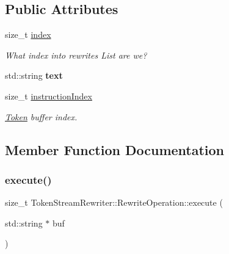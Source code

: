 \subsection*{Public Attributes}
\begin{DoxyCompactItemize}
\item 
\mbox{\label{classantlr4_1_1TokenStreamRewriter_1_1RewriteOperation_a1d3d3c3b22f030f300b3fd7c41a5ec47}} 
size\+\_\+t \hyperlink{classantlr4_1_1TokenStreamRewriter_1_1RewriteOperation_a1d3d3c3b22f030f300b3fd7c41a5ec47}{index}
\begin{DoxyCompactList}\small\item\em What index into rewrites List are we? \end{DoxyCompactList}\item 
\mbox{\label{classantlr4_1_1TokenStreamRewriter_1_1RewriteOperation_a59c0cce85a795ba97acfa8999f3cdfe6}} 
std\+::string {\bfseries text}
\item 
\mbox{\label{classantlr4_1_1TokenStreamRewriter_1_1RewriteOperation_a6a6ef7ecb15f2be19e86808187469f70}} 
size\+\_\+t \hyperlink{classantlr4_1_1TokenStreamRewriter_1_1RewriteOperation_a6a6ef7ecb15f2be19e86808187469f70}{instruction\+Index}
\begin{DoxyCompactList}\small\item\em \hyperlink{classantlr4_1_1Token}{Token} buffer index. \end{DoxyCompactList}\end{DoxyCompactItemize}


\subsection{Member Function Documentation}
\mbox{\label{classantlr4_1_1TokenStreamRewriter_1_1RewriteOperation_a9e9998fb2aa14bbf60710dde1d6d50b0}} 
\subsubsection{\texorpdfstring{execute()}{execute()}}
{\footnotesize\ttfamily size\+\_\+t Token\+Stream\+Rewriter\+::\+Rewrite\+Operation\+::execute (\begin{DoxyParamCaption}\item[{std\+::string $\ast$}]{buf }\end{DoxyParamCaption})\hspace{0.3cm}{\ttfamily [virtual]}}


